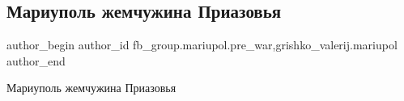  
 
 
 
 

\subsection{Мариуполь жемчужина Приазовья}
\label{sec:29_01_2023.fb.fb_group.mariupol.pre_war.1.mariupol_zhemchuzhin}
 
\ifcmt
 author_begin
   author_id fb_group.mariupol.pre_war,grishko_valerij.mariupol
 author_end
\fi

Мариуполь жемчужина Приазовья
